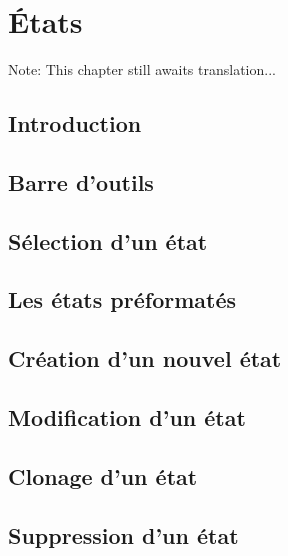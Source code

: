 
\chapter{États\label{reports}}

Note: This chapter still awaits translation...

\section{Introduction\label{reports-intro}}


\section{Barre d'outils\label{reports-functions}}


\section{Sélection d'un état\label{reports-selection}}


\section{Les états préformatés}


\section{Création d'un nouvel état}


\section{Modification d'un état\label{reports-modify}}


\section{Clonage d'un état}


\section{Suppression d'un état\label{reports-delete}}


